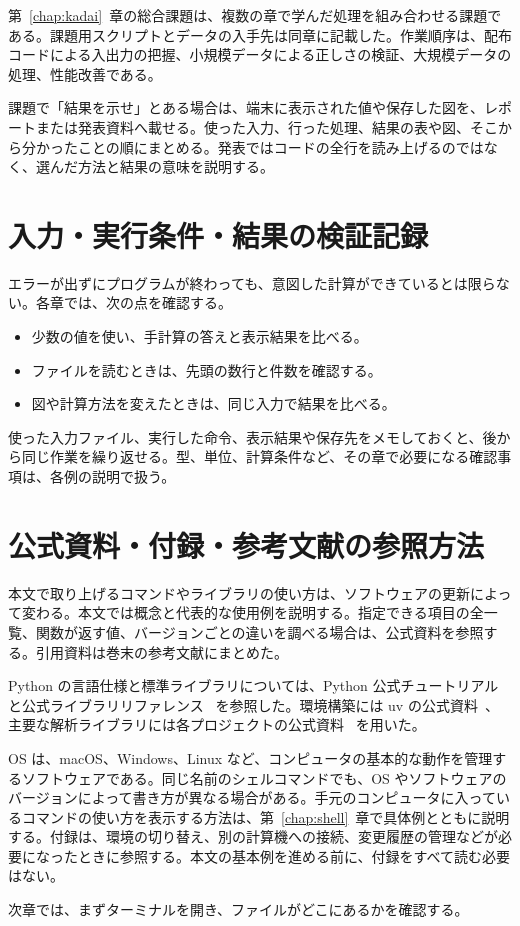 第~\ref{chap:kadai}~章の総合課題は、複数の章で学んだ処理を組み合わせる課題である。課題用スクリプトとデータの入手先は同章に記載した。作業順序は、配布コードによる入出力の把握、小規模データによる正しさの検証、大規模データの処理、性能改善である。

課題で「結果を示せ」とある場合は、端末に表示された値や保存した図を、レポートまたは発表資料へ載せる。使った入力、行った処理、結果の表や図、そこから分かったことの順にまとめる。発表ではコードの全行を読み上げるのではなく、選んだ方法と結果の意味を説明する。

\section{入力・実行条件・結果の検証記録}

エラーが出ずにプログラムが終わっても、意図した計算ができているとは限らない。各章では、次の点を確認する。

\begin{itemize}
\item 少数の値を使い、手計算の答えと表示結果を比べる。
\item ファイルを読むときは、先頭の数行と件数を確認する。
\item 図や計算方法を変えたときは、同じ入力で結果を比べる。
\end{itemize}

使った入力ファイル、実行した命令、表示結果や保存先をメモしておくと、後から同じ作業を繰り返せる。型、単位、計算条件など、その章で必要になる確認事項は、各例の説明で扱う。

\section{公式資料・付録・参考文献の参照方法}
\label{sec:reference-guide}

本文で取り上げるコマンドやライブラリの使い方は、ソフトウェアの更新によって変わる。本文では概念と代表的な使用例を説明する。指定できる項目の全一覧、関数が返す値、バージョンごとの違いを調べる場合は、公式資料を参照する。引用資料は巻末の参考文献にまとめた。

Python の言語仕様と標準ライブラリについては、Python 公式チュートリアル~\cite{python_tutorial} と公式ライブラリリファレンス~\cite{python_library} を参照した。環境構築には uv の公式資料~\cite{uv_docs}、主要な解析ライブラリには各プロジェクトの公式資料~\cite{numpy_quickstart,pandas_tutorials,polars_concepts,matplotlib_quick_start,scipy_user_guide,astropy_user_guide} を用いた。

OS は、macOS、Windows、Linux など、コンピュータの基本的な動作を管理するソフトウェアである。同じ名前のシェルコマンドでも、OS やソフトウェアのバージョンによって書き方が異なる場合がある。手元のコンピュータに入っているコマンドの使い方を表示する方法は、第~\ref{chap:shell}~章で具体例とともに説明する。付録は、環境の切り替え、別の計算機への接続、変更履歴の管理などが必要になったときに参照する。本文の基本例を進める前に、付録をすべて読む必要はない。

次章では、まずターミナルを開き、ファイルがどこにあるかを確認する。
